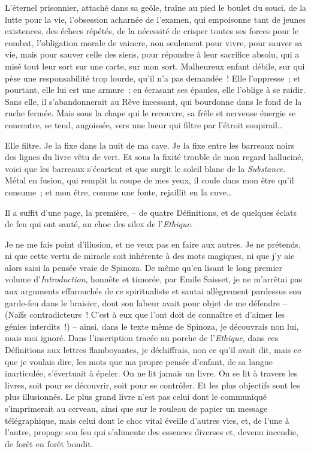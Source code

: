 L'éternel prisonnier, attaché dans sa geôle, traîne au pied le boulet du
souci, de la lutte pour la vie, l'obsession acharnée de l'examen, qui
empoisonne tant de jeunes existences, des échecs répétés, de la
nécessité de crisper toutes ses forces pour le combat, l'obligation
morale de vaincre, non seulement pour vivre, pour sauver sa vie, mais
pour sauver celle des siens, pour répondre à leur sacrifice absolu, qui
a misé tout leur sort sur une carte, sur mon sort. Malheureux enfant
débile, sur qui pèse une responsabilité trop lourde, qu'il n'a pas
demandée~! Elle l'oppresse~; et pourtant, elle lui est une armure~; en
écrasant ses épaules, elle l'oblige à se raidir. Sans elle, il
s'abandonnerait au Rêve incessant, qui bourdonne dans le fond de la
ruche fermée. Mais sous la chape qui le recouvre, sa frêle et nerveuse
énergie se concentre, se tend, angoissée, vers une lueur qui filtre par
l'étroit soupirail\ldots{}

Elle filtre. Je la fixe dans la nuit de ma cave. Je la fixe entre les
barreaux noirs des lignes du livre vêtu de vert. Et sous la fixité
trouble de mon regard halluciné, voici que les barreaux s'écartent et
que surgit le soleil blanc de la \emph{Substance}. Métal en fusion, qui
remplit la coupe de mes yeux, il coule dans mon être qu'il consume~; et
mon être, comme une fonte, rejaillit en la cuve\ldots{}

Il a suffit d'une page, la première, -- de quatre Définitions, et de
quelques éclats de feu qui ont sauté, au choc des silex de
l'\emph{Ethique}.

Je ne me fais point d'illusion, et ne veux pas en faire aux autres. Je
ne prétends, ni que cette vertu de miracle soit inhérente à des mots
magiques, ni que j'y aie alors saisi la pensée vraie de Spinoza. De même
qu'en lisant le long premier volume d'\emph{Introduction}, honnête et
timorée, par Emile Saisset, je ne m'arrêtai pas aux arguments
effarouchés de ce spiritualiste et sautai allègrement pardessus son
garde-feu dans le braisier, dont son labeur avait pour objet de me
défendre -- (Naïfs contradicteurs~! C'est à eux que l'ont doit de
connaître et d'aimer les génies interdits~!) -- ainsi, dans le texte
même de Spinoza, je découvrais non lui, mais moi ignoré. Dans
l'inscription tracée au porche de l'\emph{Ethique}, dans ces Définitions
aux lettres flamboyantes, je déchiffrais, non ce qu'il avait dit, mais
ce que je voulais dire, les mots que ma propre pensée d'enfant, de sa
langue inarticulée, s'évertuait à épeler. On ne lit jamais un livre. On
se lit à travers les livres, soit pour se découvrir, soit pour se
contrôler. Et les plus objectifs sont les plus illusionnés. Le plus
grand livre n'est pas celui dont le communiqué s'imprimerait au cerveau,
ainsi que sur le rouleau de papier un message télégraphique, mais celui
dont le choc vital éveille d'autres vies, et, de l'une à l'autre,
propage son feu qui s'alimente des essences diverses et, devenu
incendie, de forêt en forêt bondit.


